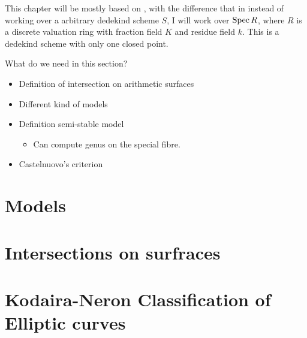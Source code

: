 This chapter will be mostly based on \cite[chap.\ 8, 9, 10]{liuAlgebraicGeometryArithmetic2002}, with the difference that in instead of working over a arbitrary dedekind scheme $S$, I will work over $\operatorname{Spec} R$, where $R$ is a discrete valuation ring with fraction field $K$ and residue field $k$. This is a dedekind scheme with only one closed point.  


What do we need in this section? 
\begin{itemize}
	\item Definition of intersection on arithmetic surfaces
	\item Different kind of models
	\item Definition semi-stable model
		\begin{itemize}
			\item Can compute genus on the special fibre. 
		\end{itemize}
	\item Castelnuovo's criterion
\end{itemize}

\section{Models} \label{sec:models}


\section{Intersections on surfraces} \label{sec:intersections_on_surfraces}




\section{Kodaira-Neron Classification of Elliptic curves} \label{sec:kodaira-neron_classification_of_elliptic_curves}


